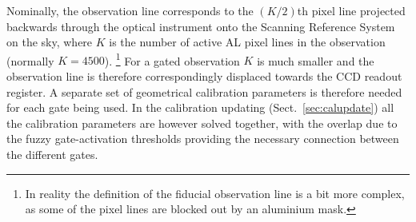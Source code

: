 \documentclass[structabstract]{aa}
\begin{document}
Nominally, the observation line corresponds to the $(K/2)$th pixel line
projected backwards through the optical instrument onto the Scanning
Reference System on the sky, where $K$ is the number of active AL pixel
lines in the observation (normally $K=4500$).%
\footnote{In reality the definition of the fiducial observation line is
a bit more complex, as some of the pixel lines are blocked out by an
aluminium mask.} For a gated observation
$K$ is much smaller and the observation line is therefore correspondingly
displaced towards the CCD readout register. A separate set of geometrical
calibration parameters is therefore needed for each gate being used.
In the calibration updating (Sect.~\ref{sec:calupdate}) all the calibration parameters 
are however solved together, with the
overlap due to the fuzzy gate-activation thresholds providing the necessary 
connection between the different gates.
\end{document}
